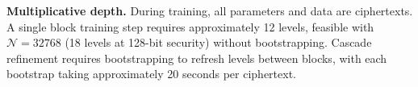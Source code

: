 \textbf{Multiplicative depth.} During training, all parameters and data are ciphertexts. A single block training step requires approximately 12 levels, feasible with $\mathcal{N}{=}32768$ (18 levels at 128-bit security) without bootstrapping. Cascade refinement requires bootstrapping to refresh levels between blocks, with each bootstrap taking approximately 20 seconds per ciphertext.












